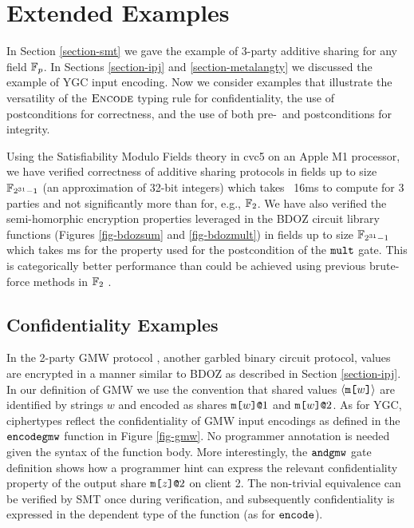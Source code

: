 \section{Extended Examples}
\label{section-examples}

In Section \ref{section-smt} we gave the example of 3-party additive
sharing for any field $\mathbb{F}_{p}$. In Sections \ref{section-ipj} and
\ref{section-metalangty} we discussed the example of YGC input encoding.
Now we consider examples that illustrate the versatility of the
$\text{\sc Encode}$ typing rule for confidentiality, the use of
postconditions for correctness, and the use of both pre-~and
postconditions for integrity.

Using the Satisfiability Modulo Fields theory in cvc5 on an Apple M1
processor, we have verified correctness of additive sharing protocols
in fields up to size $\mathbb{F}_{2^{31} - 1}$ (an approximation of 32-bit
integers) which takes ~16ms to compute for 3 parties and not
significantly more than for, e.g., $\mathbb{F}_{2}$. We have also verified
the semi-homorphic encryption properties leveraged in the BDOZ circuit
library functions (Figures \ref{fig-bdozsum} and \ref{fig-bdozmult}) in
fields up to size $\mathbb{F}_{2^{31} - 1}$ which takes ms for the
property used for the postcondition of the $\texttt{mult}$ gate. This is
categorically better performance than could be achieved using previous
brute-force methods in $\mathbb{F}_{2}$ \cite{skalka-near-ppdp24}.

\subsection{Confidentiality Examples}



In the 2-party GMW protocol \cite{evans2018pragmatic}, another garbled
binary circuit protocol, values are encrypted in a manner similar to
BDOZ as described in Section \ref{section-ipj}. In our definition of
GMW we use the convention that shared values $\langle \texttt{m[}w\texttt{]} \rangle$ are
identified by strings $w$ and encoded as shares $\texttt{m[}w\texttt{]}\texttt{@}1$ and
$\texttt{m[}w\texttt{]}\texttt{@}2$.  As for YGC, ciphertypes reflect the confidentiality of
GMW input encodings as defined in the $\texttt{encodegmw}$ function in
Figure \ref{fig-gmw}. No programmer annotation is needed given the
syntax of the function body. More interestingly, the $\texttt{andgmw}$
gate definition shows how a programmer hint can express the relevant
confidentiality property of the output share $\texttt{m[}z\texttt{]}\texttt{@}2$ on client
2. The non-trivial equivalence can be verified by SMT once during
verification, and subsequently confidentiality is expressed in the
dependent type of the function (as for $\texttt{encode}$).

